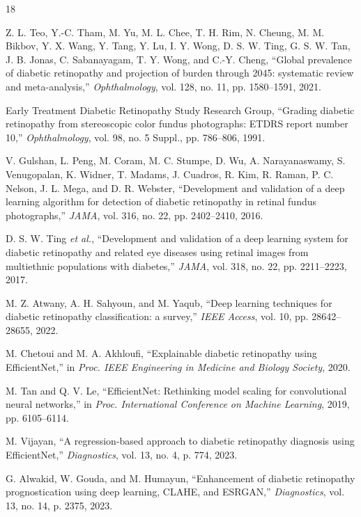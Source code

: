 \documentclass[11pt,a4paper]{article}
\begin{document}
\begin{thebibliography}{18}

Z. L. Teo, Y.-C. Tham, M. Yu, M. L. Chee, T. H. Rim, N. Cheung, M. M. Bikbov, Y. X. Wang, Y. Tang, Y. Lu, I. Y. Wong, D. S. W. Ting, G. S. W. Tan, J. B. Jonas, C. Sabanayagam, T. Y. Wong, and C.-Y. Cheng, ``Global prevalence of diabetic retinopathy and projection of burden through 2045: systematic review and meta-analysis,'' \emph{Ophthalmology}, vol. 128, no. 11, pp. 1580--1591, 2021.

Early Treatment Diabetic Retinopathy Study Research Group, ``Grading diabetic retinopathy from stereoscopic color fundus photographs: ETDRS report number 10,'' \emph{Ophthalmology}, vol. 98, no. 5 Suppl., pp. 786--806, 1991.

V. Gulshan, L. Peng, M. Coram, M. C. Stumpe, D. Wu, A. Narayanaswamy, S. Venugopalan, K. Widner, T. Madams, J. Cuadros, R. Kim, R. Raman, P. C. Nelson, J. L. Mega, and D. R. Webster, ``Development and validation of a deep learning algorithm for detection of diabetic retinopathy in retinal fundus photographs,'' \emph{JAMA}, vol. 316, no. 22, pp. 2402--2410, 2016.

D. S. W. Ting \emph{et al.}, ``Development and validation of a deep learning system for diabetic retinopathy and related eye diseases using retinal images from multiethnic populations with diabetes,'' \emph{JAMA}, vol. 318, no. 22, pp. 2211--2223, 2017.

M. Z. Atwany, A. H. Sahyoun, and M. Yaqub, ``Deep learning techniques for diabetic retinopathy classification: a survey,'' \emph{IEEE Access}, vol. 10, pp. 28642--28655, 2022.

M. Chetoui and M. A. Akhloufi, ``Explainable diabetic retinopathy using EfficientNet,'' in \emph{Proc. IEEE Engineering in Medicine and Biology Society}, 2020.

M. Tan and Q. V. Le, ``EfficientNet: Rethinking model scaling for convolutional neural networks,'' in \emph{Proc. International Conference on Machine Learning}, 2019, pp. 6105--6114.

M. Vijayan, ``A regression-based approach to diabetic retinopathy diagnosis using EfficientNet,'' \emph{Diagnostics}, vol. 13, no. 4, p. 774, 2023.

G. Alwakid, W. Gouda, and M. Humayun, ``Enhancement of diabetic retinopathy prognostication using deep learning, CLAHE, and ESRGAN,'' \emph{Diagnostics}, vol. 13, no. 14, p. 2375, 2023.


\end{thebibliography}
\end{document}
